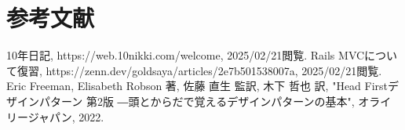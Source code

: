 \documentclass[dvipdfmx,fleqn,article]{jlreq}
\begin{document}
\section{参考文献}
\begin{thebibliography}{9}


    10年日記, https://web.10nikki.com/welcome, 2025/02/21閲覧.
    Rails MVCについて復習, https://zenn.dev/goldsaya/articles/2e7b501538007a, 2025/02/21閲覧.
    Eric Freeman, Elisabeth Robson 著, 佐藤 直生 監訳, 木下 哲也 訳, "Head Firstデザインパターン 第2版 ―頭とからだで覚えるデザインパターンの基本", オライリージャパン, 2022.
\end{thebibliography}
\end{document}
